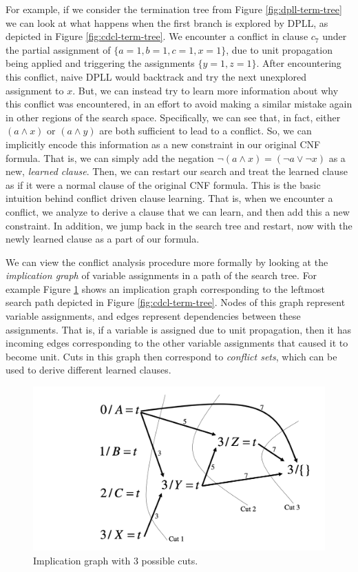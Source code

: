 \documentclass[12pt]{article}
\begin{document}
For example, if we consider the termination tree from Figure \ref{fig:dpll-term-tree} we can look at what happens when the first branch is explored by DPLL, as depicted in Figure \ref{fig:cdcl-term-tree}. We encounter a conflict in clause $c_7$ under the partial assignment of $\{a=1,b=1,c=1,x=1\}$, due to unit propagation being applied and triggering the assignments $\{y=1, z=1\}$. After encountering this conflict, naive DPLL would backtrack and try the next unexplored assignment to $x$. But, we can instead try to learn more information about why this conflict was encountered, in an effort to avoid making a similar mistake again in other regions of the search space. Specifically, we can see that, in fact, either $(a \wedge x)$ or $(a \wedge y)$ are both sufficient to lead to a conflict. So, we can implicitly encode this information as a new constraint in our original CNF formula. That is, we can simply add the negation $\neg (a \wedge x) = (\neg a \vee \neg x)$ as a new, \textit{learned clause}. Then, we can restart our search and treat the learned clause as if it were a normal clause of the original CNF formula. This is the basic intuition behind conflict driven clause learning. That is, when we encounter a conflict, we analyze to derive a clause that we can learn, and then add this a new constraint. In addition, we jump back in the search tree and restart, now with the newly learned clause as a part of our formula.

We can view the conflict analysis procedure more formally by looking at the \textit{implication graph} of variable assignments in a path of the search tree. For example Figure \ref{fig:impl-graph} shows an implication graph corresponding to the leftmost search path depicted in Figure \ref{fig:cdcl-term-tree}. Nodes of this graph represent variable assignments, and edges represent dependencies between these assignments. That is, if a variable is assigned due to unit propagation, then it has incoming edges corresponding to the other variable assignments that caused it to become unit. Cuts in this graph then correspond to \textit{conflict sets}, which can be used to derive different learned clauses. 

\begin{figure}
    \begin{center}
        \includegraphics[scale=0.4]{figures/impl-graph.png}
    \end{center}
    \label{fig:impl-graph}
    \caption{Implication graph with 3 possible cuts.}
\end{figure}
\end{document}
